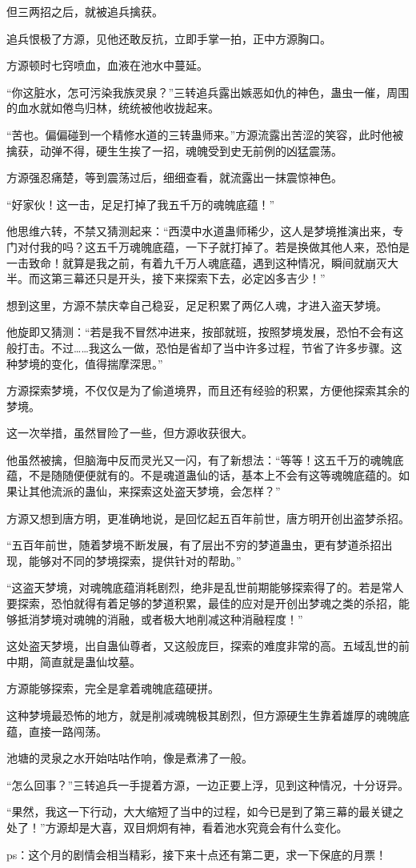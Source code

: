 \begin{this_body}
但三两招之后，就被追兵擒获。

追兵恨极了方源，见他还敢反抗，立即手掌一拍，正中方源胸口。

方源顿时七窍喷血，血液在池水中蔓延。

“你这脏水，怎可污染我族灵泉？”三转追兵露出嫉恶如仇的神色，蛊虫一催，周围的血水就如倦鸟归林，统统被他收拢起来。

“苦也。偏偏碰到一个精修水道的三转蛊师来。”方源流露出苦涩的笑容，此时他被擒获，动弹不得，硬生生挨了一招，魂魄受到史无前例的凶猛震荡。

方源强忍痛楚，等到震荡过后，细细查看，就流露出一抹震惊神色。

“好家伙！这一击，足足打掉了我五千万的魂魄底蕴！”

他思维六转，不禁又猜测起来：“西漠中水道蛊师稀少，这人是梦境推演出来，专门对付我的吗？这五千万魂魄底蕴，一下子就打掉了。若是换做其他人来，恐怕是一击致命！就算是我之前，有着九千万人魂底蕴，遇到这种情况，瞬间就崩灭大半。而这第三幕还只是开头，接下来探索下去，必定凶多吉少！”

想到这里，方源不禁庆幸自己稳妥，足足积累了两亿人魂，才进入盗天梦境。

他旋即又猜测：“若是我不冒然冲进来，按部就班，按照梦境发展，恐怕不会有这般打击。不过……我这么一做，恐怕是省却了当中许多过程，节省了许多步骤。这种梦境的变化，值得揣摩深思。”

方源探索梦境，不仅仅是为了偷道境界，而且还有经验的积累，方便他探索其余的梦境。

这一次举措，虽然冒险了一些，但方源收获很大。

他虽然被擒，但脑海中反而灵光又一闪，有了新想法：“等等！这五千万的魂魄底蕴，不是随随便便就有的。不是魂道蛊仙的话，基本上不会有这等魂魄底蕴的。如果让其他流派的蛊仙，来探索这处盗天梦境，会怎样？”

方源又想到唐方明，更准确地说，是回忆起五百年前世，唐方明开创出盗梦杀招。

“五百年前世，随着梦境不断发展，有了层出不穷的梦道蛊虫，更有梦道杀招出现，能够对不同的梦境探索，提供针对的帮助。”

“这盗天梦境，对魂魄底蕴消耗剧烈，绝非是乱世前期能够探索得了的。若是常人要探索，恐怕就得有着足够的梦道积累，最佳的应对是开创出梦魂之类的杀招，能够抵消梦境对魂魄的消融，或者极大地削减这种消融程度！”

这处盗天梦境，出自蛊仙尊者，又这般庞巨，探索的难度非常的高。五域乱世的前中期，简直就是蛊仙坟墓。

方源能够探索，完全是拿着魂魄底蕴硬拼。

这种梦境最恐怖的地方，就是削减魂魄极其剧烈，但方源硬生生靠着雄厚的魂魄底蕴，直接一路闯荡。

池塘的灵泉之水开始咕咕作响，像是煮沸了一般。

“怎么回事？”三转追兵一手提着方源，一边正要上浮，见到这种情况，十分讶异。

“果然，我这一下行动，大大缩短了当中的过程，如今已是到了第三幕的最关键之处了！”方源却是大喜，双目炯炯有神，看着池水究竟会有什么变化。

ps：这个月的剧情会相当精彩，接下来十点还有第二更，求一下保底的月票！

\end{this_body}


